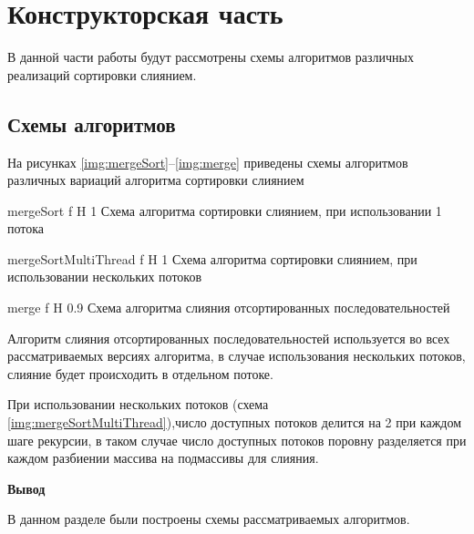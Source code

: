 \chapter{Конструкторская часть}
В данной части работы будут рассмотрены схемы алгоритмов различных реализаций сортировки слиянием.

\section{Схемы алгоритмов}

На рисунках \ref{img:mergeSort}--\ref{img:merge} приведены схемы алгоритмов различных вариаций алгоритма сортировки слиянием

{mergeSort} %
{f} %
{H} %
{1\textwidth} %
{Схема алгоритма сортировки слиянием, при использовании 1 потока} %

{mergeSortMultiThread} %
{f} %
{H} %
{1\textwidth} %
{Схема алгоритма сортировки слиянием, при использовании нескольких потоков} %

{merge} %
{f} %
{H} %
{0.9\textwidth} %
{Схема алгоритма слияния отсортированных последовательностей} %

\newpage

Алгоритм слияния отсортированных последовательностей используется во всех рассматриваемых версиях алгоритма, в случае использования нескольких потоков, слияние будет происходить в отдельном потоке.

При использовании нескольких потоков (схема \ref{img:mergeSortMultiThread}),число доступных потоков делится на 2 при каждом шаге рекурсии, в таком случае число доступных потоков поровну разделяется при каждом разбиении массива на подмассивы для слияния.

\textbf{Вывод}

В данном разделе  были построены схемы рассматриваемых алгоритмов.

